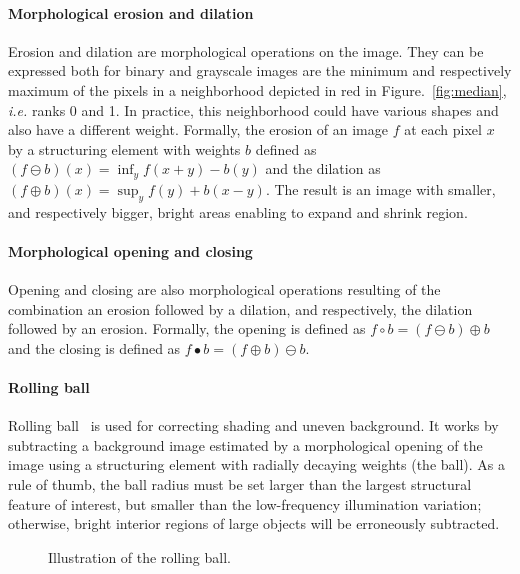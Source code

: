 \paragraph{Morphological erosion and dilation} Erosion and dilation are morphological operations on the image. They can be expressed both for binary and grayscale images are the minimum and respectively maximum of the pixels in a neighborhood depicted in red in Figure.~\ref{fig:median}, \textit{i.e.} ranks 0 and 1. In practice, this neighborhood could have various shapes and also have a different weight. Formally, the erosion of an image $f$ at each pixel $x$ by a structuring element with weights $b$ defined as $(f \ominus b)(x) = \inf_{y} f(x+y) - b(y)$ and the dilation as $(f \oplus b)(x) = \sup_{y} f(y) + b(x-y)$. The result is an image with smaller, and respectively bigger, bright areas enabling to expand and shrink region.

\paragraph{Morphological opening and closing} Opening and closing are also morphological operations resulting of the combination an erosion followed by a dilation, and respectively, the dilation followed by an erosion. Formally, the opening is defined as $f \circ b  = (f \ominus b) \oplus b$ and the closing is defined as $f \bullet  b  = (f \oplus b) \ominus b$.

\paragraph{Rolling ball} Rolling ball~\cite{sternberg1983} is used for correcting shading and uneven background. It works by subtracting a background image estimated by a morphological opening of the image using a structuring element with radially decaying weights (the ball). As a rule of thumb, the ball radius must be set larger than the largest structural feature of interest, but smaller than the low-frequency illumination variation; otherwise, bright interior regions of large objects will be erroneously subtracted.

\begin{figure}[ht]\centering
  \caption{Illustration of the rolling ball.}
  \label{fig:algorithm}
\end{figure}

